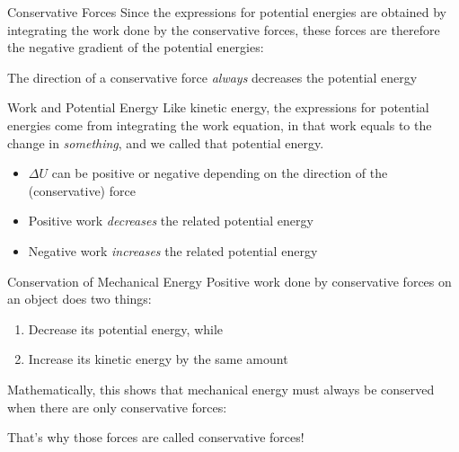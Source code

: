 \documentclass[12pt,compress,aspectratio=169]{beamer}
\newcommand{\mb}[1]{\ensuremath\mathbf{#1}}
\newcommand{\eq}[2]{\vspace{#1}{\Large\begin{displaymath}#2\end{displaymath}}}
\begin{document}
\begin{frame}{Conservative Forces}
  Since the expressions for potential energies are obtained by integrating the
  work done by the conservative forces, these forces are therefore the
  negative gradient of the potential energies:

  \eq{-.2in}{
    \boxed{\mb{F}=-\nabla U=
      -\frac{\partial U}{\partial x}\bm{\hat{\imath}}
      -\frac{\partial U}{\partial y}\bm{\hat{\jmath}}
      -\frac{\partial U}{\partial z}\hat{\bm{k}}
    }
  }

  The direction of a conservative force \emph{always} decreases the potential
  energy
\end{frame}




\begin{frame}{Work and Potential Energy}
  Like kinetic energy, the expressions for potential energies come from
  integrating the work equation, in that work equals to the change in
  \emph{something}, and we called that potential energy.

  \eq{-.3in}{
    \boxed{W=-\Delta U}
  }
  \begin{itemize}
  \item\vspace{-.15in}$\Delta U$ can be positive or negative depending on the
    direction of the (conservative) force
  \item Positive work \emph{decreases} the related potential energy
  \item Negative work \emph{increases} the related potential energy
  \end{itemize}
\end{frame}



\begin{frame}{Conservation of Mechanical Energy}
  Positive work done by conservative forces on an object does two things:
  \begin{enumerate}[1.]
  \item Decrease its potential energy, while
  \item Increase its kinetic energy by the same amount
  \end{enumerate}
  Mathematically, this shows that mechanical energy must always be conserved
  when there are only conservative forces:

  \eq{-.15in}{
    W=-\Delta U = \Delta K \quad\longrightarrow\quad
    \boxed{\Delta K + \Delta U =0}
  }

  That's why those forces are called conservative forces!
\end{frame}
\end{document}
